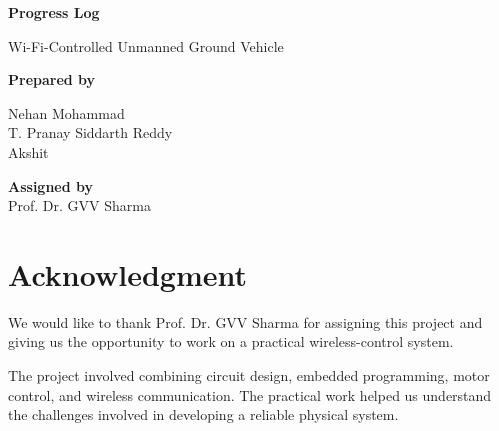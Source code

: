 \documentclass[11pt,a4paper]{article}
\begin{document}

\begin{titlepage}
    \centering

    \vspace*{2.2cm}

    {\Huge\bfseries Progress Log\par}

    \vspace{1.0cm}

    {\Large Wi-Fi-Controlled Unmanned Ground Vehicle\par}

    \vspace{1.8cm}

    {\large\textbf{Prepared by}\par}

    \vspace{0.4cm}

    {\large
    Nehan Mohammad\\[0.25em]
    T. Pranay Siddarth Reddy\\[0.25em]
    Akshit
    \par}

    \vfill

    {\large
    \textbf{Assigned by}\\
    Prof. Dr. GVV Sharma
    \par}

    \vspace*{1.3cm}

\end{titlepage}



\section*{Acknowledgment}

We would like to thank Prof. Dr. GVV Sharma for assigning
this project and giving us the opportunity to work on a
practical wireless-control system.

The project involved combining circuit design, embedded
programming, motor control, and wireless communication.
The practical work helped us understand the challenges
involved in developing a reliable physical system.
\end{document}
